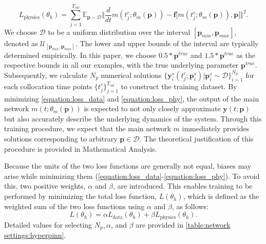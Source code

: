 \documentclass[letterpaper]{article} %
\theoremstyle{thmstyleone}%
\theoremstyle{thmstyletwo}%
\theoremstyle{thmstylethree}%
\begin{document}
\begin{equation}\label{equation:loss_phy}
L_{\text{physics}}(\theta_h) = \sum_{j=1}^{T_{col}} \mathbb{E}_{\mathbf{p}\sim\mathcal{D}} 
\Bigg\Vert \frac{d}{dt} m(t_j^{c}; \theta_m(\mathbf{p}))
- \mathbf{f}\big[m(t_j^{c}; \theta_m(\mathbf{p})), \mathbf{p} \big] \Bigg\Vert^2.
\end{equation}
We choose $\mathcal{D}$ to be a uniform distribution over the interval $[\mathbf{p}_{min}, \mathbf{p}_{max}]$, denoted as $\mathcal{U}_{[\mathbf{p}_{min}, \mathbf{p}_{max}]}$. The lower and upper bounds of the interval are typically determined empirically. In this paper, we choose $0.5*\mathbf{p}^{true}$ and $1.5*\mathbf{p}^{true}$ as the respective bounds in all our examples, with the true underlying parameter $\mathbf{p}^{true}$. Subsequently, we calculate $N_{p}$ numerical solutions $\{\mathbf{y}_{i}^{s}(t_{j}^{c};\mathbf{p}^{s}_{i}) | \mathbf{p}^{s}_{i}\sim\mathcal{D}\}_{i=1}^{N_{p}}$ for each collocation time points $\{t_{j}^{c}\}_{j=1}^{T_{col}}$ to construct the training dataset. By minimizing \cref{equation:loss_data} and \cref{equation:loss_phy}, the output of the main network $m(t;\theta_m(\mathbf{p}))$ is expected to not only closely approximate $\mathbf{y}(t;\mathbf{p})$ but also accurately describe the underlying dynamics of the system. Through this training procedure, we expect that the main network $m$ immediately provides solutions corresponding to arbitrary $\mathbf{p}\in\mathcal{D}$. The theoretical justification of this procedure is provided in Mathematical Analysis.

Because the units of the two loss functions are generally not equal, biases may arise while minimizing them (\cref{equation:loss_data}-\cref{equation:loss_phy}). To avoid this, two positive weights, $\alpha$ and $\beta$, are introduced. This enables training to be performed by minimizing the total loss function, $L(\theta_h)$, which is defined as the weighted sum of the two loss functions using $\alpha$ and $\beta$, as follows:
\begin{equation}\label{equation:total}
L(\theta_h) = \alpha L_{\text{data}}(\theta_h) + \beta L_{\text{physics}}(\theta_h).
\end{equation} Detailed values for selecting $N_p, \alpha$, and $\beta$ are provided in  \cref{table:network settings:hyperpinn}.
\end{document}
